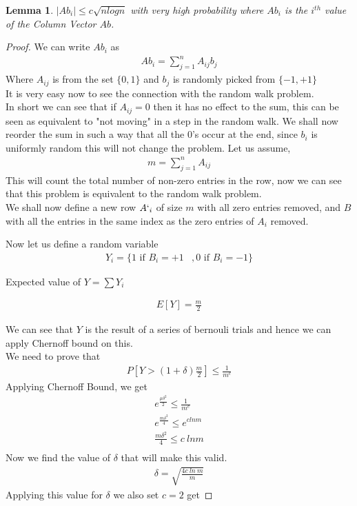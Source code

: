 \documentclass{assignment}
\begin{document}
\begin{problemlist}
\begin{problem}
\begin{answer}
\newtheorem{lemsetbal}{Lemma}
\begin{lemsetbal}
$|Ab_i| \leq c \sqrt{n log n}$ with very high probability where $Ab_i$ is the $i^{th}$ value of the Column Vector $Ab$.     
\end{lemsetbal}
\begin{proof}
We can write $Ab_i$ as 
\begin{eqnarray}
 Ab_i = \sum_{j=1}^n A_{ij} b_j
\end{eqnarray}
Where $A_{ij}$ is from the set $\{0,1\}$ and $b_j$ is randomly picked from $\{-1,+1\}$\\
It is very easy now to see the connection with the random walk problem. \\
In short we can see that if $A_{ij} = 0$ then it has no effect to the sum, this can be seen as equivalent to "not moving" in a step in the random walk. We shall now reorder the sum in such a way that all the 0's occur at the end, since $b_i$ is uniformly random this will not change the problem. Let us assume, 
\begin{eqnarray}
m= \sum_{j=1}^n A_{ij}
\end{eqnarray}
This will count the total number of non-zero entries in the row, now we can see that this problem is equivalent to the random walk problem. \\
We shall now define a new row $A`_i$ of size $m$ with all zero entries removed, and $B$ with all the entries in the same index as the zero entries of $A_i$ removed. 

Now let us define a random variable 
\begin{eqnarray}
Y_i = \{1 \textrm{ if } B_i = +1 &  , 0  \textrm{ if } B_i = -1\}
\end{eqnarray}

Expected value of $Y=\sum Y_i$

\begin{eqnarray}
E[Y] = \frac{m}{2}
\end{eqnarray}

We can see that $Y$ is the result of a series of bernouli trials and hence we can apply Chernoff bound on this. \\

We need to prove that 
\begin{eqnarray}
P [Y > (1+ \delta) \frac{m}{2}] \leq \frac{1}{m^c}
\end{eqnarray}
Applying Chernoff Bound, we get 
\begin{eqnarray}
e^{\frac{\mu \delta ^2}{2}} \leq \frac{1}{m^c} \\
e^{\frac{m \delta ^2}{4}} \leq e^{c ln m} \\
\frac{m \delta ^2}{4} \leq c \: ln m\\
\end{eqnarray}
Now we find the value of $\delta$ that will make this valid.
\begin{eqnarray}
\delta = \sqrt{\frac{4 c \: ln \:m}{m}}
\end{eqnarray}
Applying this value for $\delta$ we also set $c=2$ get 


\end{proof}
\end{answer}
\end{problem}
\end{problemlist}
\end{document}
